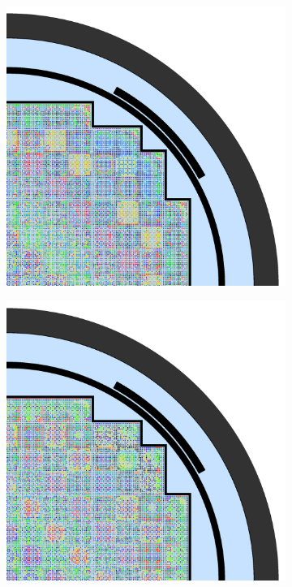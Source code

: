 \begin{figure}[h!]
\centering
\begin{subfigure}{0.68\textwidth}
  \centering
  \includegraphics[width=\linewidth]{figures/unsupervised/geometries/with-features/32-clusters/pinch/full-core}
  \caption{}
  \label{fig:chap10-full-core-pinch-32}
\end{subfigure}
\begin{subfigure}{0.68\textwidth}
  \centering
  \includegraphics[width=\linewidth]{figures/unsupervised/geometries/with-features/32-clusters/combined/full-core}

\end{subfigure}
\end{figure}
